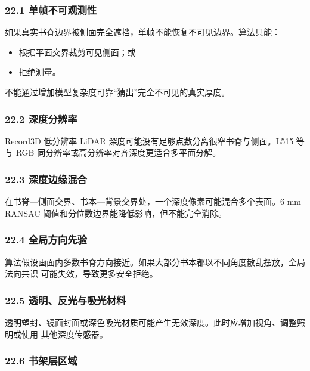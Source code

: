\documentclass[
  chinese,
  11pt,
  a4paper,
]{article}
\providecommand{\tightlist}{%
  \setlength{\itemsep}{0pt}\setlength{\parskip}{0pt}}
\begin{document}
\subsubsection{22.1
单帧不可观测性}\label{221-ux5355ux5e27ux4e0dux53efux89c2ux6d4bux6027}

如果真实书脊边界被侧面完全遮挡，单帧不能恢复不可见边界。算法只能：

\begin{itemize}
\tightlist
\item
  根据平面交界裁剪可见侧面；或
\item
  拒绝测量。
\end{itemize}

不能通过增加模型复杂度可靠``猜出''完全不可见的真实厚度。

\subsubsection{22.2
深度分辨率}\label{222-ux6df1ux5ea6ux5206ux8fa8ux7387}

Record3D 低分辨率 LiDAR 深度可能没有足够点数分离很窄书脊与侧面。L515
等与 RGB 同分辨率或高分辨率对齐深度更适合多平面分解。

\subsubsection{22.3
深度边缘混合}\label{223-ux6df1ux5ea6ux8fb9ux7f18ux6df7ux5408}

在书脊---侧面交界、书本---背景交界处，一个深度像素可能混合多个表面。6 mm
RANSAC 阈值和分位数边界能降低影响，但不能完全消除。

\subsubsection{22.4
全局方向先验}\label{224-ux5168ux5c40ux65b9ux5411ux5148ux9a8c}

算法假设画面内多数书脊方向接近。如果大部分书本都以不同角度散乱摆放，全局法向共识
可能失效，导致更多安全拒绝。

\subsubsection{22.5
透明、反光与吸光材料}\label{225-ux900fux660eux53cdux5149ux4e0eux5438ux5149ux6750ux6599}

透明塑封、镜面封面或深色吸光材质可能产生无效深度。此时应增加视角、调整照明或使用
其他深度传感器。

\subsubsection{22.6
书架层区域}\label{226-ux4e66ux67b6ux5c42ux533aux57df}
\end{document}
